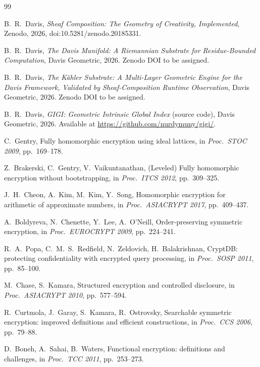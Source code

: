 \documentclass[11pt,letterpaper]{article}
\begin{document}
\begin{thebibliography}{99}

B.~R.\ Davis,
\emph{Sheaf Composition: The Geometry of Creativity, Implemented},
Zenodo, 2026, doi:10.5281/zenodo.20185331.

B.~R.\ Davis,
\emph{The Davis Manifold: A Riemannian Substrate for Residue-Bounded
Computation},
Davis Geometric, 2026. Zenodo DOI to be assigned.

B.~R.\ Davis,
\emph{The K\"ahler Substrate: A Multi-Layer Geometric Engine for the
Davis Framework, Validated by Sheaf-Composition Runtime Observation},
Davis Geometric, 2026. Zenodo DOI to be assigned.

B.~R.\ Davis,
\emph{GIGI: Geometric Intrinsic Global Index} (source code),
Davis Geometric, 2026.
Available at \url{https://github.com/nurdymuny/gigi/}.

C.~Gentry,
Fully homomorphic encryption using ideal lattices,
in \emph{Proc.\ STOC 2009}, pp.\ 169--178.

Z.~Brakerski, C.~Gentry, V.~Vaikuntanathan,
(Leveled) Fully homomorphic encryption without bootstrapping,
in \emph{Proc.\ ITCS 2012}, pp.\ 309--325.

J.~H.\ Cheon, A.~Kim, M.~Kim, Y.~Song,
Homomorphic encryption for arithmetic of approximate numbers,
in \emph{Proc.\ ASIACRYPT 2017}, pp.\ 409--437.

A.~Boldyreva, N.~Chenette, Y.~Lee, A.~O'Neill,
Order-preserving symmetric encryption,
in \emph{Proc.\ EUROCRYPT 2009}, pp.\ 224--241.

R.~A.\ Popa, C.~M.~S.\ Redfield, N.~Zeldovich, H.~Balakrishnan,
CryptDB: protecting confidentiality with encrypted query processing,
in \emph{Proc.\ SOSP 2011}, pp.\ 85--100.

M.~Chase, S.~Kamara,
Structured encryption and controlled disclosure,
in \emph{Proc.\ ASIACRYPT 2010}, pp.\ 577--594.

R.~Curtmola, J.~Garay, S.~Kamara, R.~Ostrovsky,
Searchable symmetric encryption: improved definitions and efficient
constructions,
in \emph{Proc.\ CCS 2006}, pp.\ 79--88.

D.~Boneh, A.~Sahai, B.~Waters,
Functional encryption: definitions and challenges,
in \emph{Proc.\ TCC 2011}, pp.\ 253--273.


\end{thebibliography}
\end{document}
